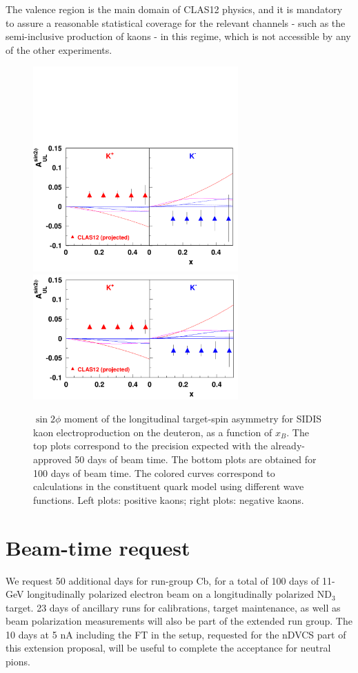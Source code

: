 The valence region is the main domain of CLAS12 physics, and it is mandatory to assure a reasonable statistical coverage for the relevant channels - such as the semi-inclusive production of kaons - in this regime, which is not accessible by any of the other experiments. 
%
\begin{figure}
\centering
\includegraphics[width=0.7\textwidth]{sidis/aul_kaons.pdf}
\includegraphics[width=0.7\textwidth]{sidis/aul_kaons_x2.pdf}
\caption{\label{fig::AULptcosdeutkaonsx2}$\sin 2\phi$ moment of the longitudinal target-spin asymmetry for SIDIS kaon electroproduction on the deuteron, as a function of $x_B$. The top plots correspond to the precision expected with the already-approved 50 days of beam time. The bottom plots are obtained for 100 days of beam time. The colored curves correspond to calculations in the constituent quark model \cite{kaon_aulsin2phi_models} using different wave functions. Left plots: positive kaons; right plots: negative kaons.}
\end{figure}
%
\section{Beam-time request}
We request 50 additional days for run-group Cb, for a total of 100 days of 11-GeV longitudinally polarized electron beam on a longitudinally polarized ND$_3$ target. 23 days of ancillary runs for calibrations, target maintenance, as well as beam polarization measurements will also be part of the extended run group. The 10 days at 5 nA including the FT in the setup, requested for the nDVCS part of this extension proposal, will be useful to complete the acceptance for neutral pions. 
